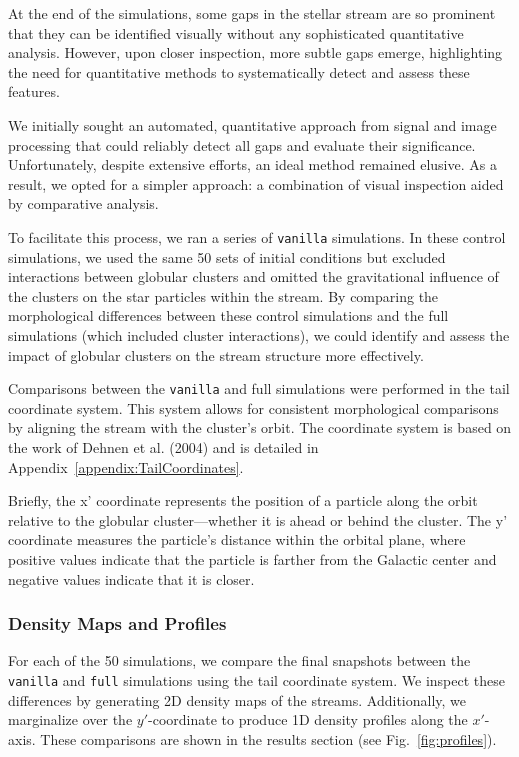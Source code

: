\documentclass[draft]{aa}
\begin{document}
    At the end of the simulations, some gaps in the stellar stream are so prominent that they can be identified visually without any sophisticated quantitative analysis. However, upon closer inspection, more subtle gaps emerge, highlighting the need for quantitative methods to systematically detect and assess these features.

    We initially sought an automated, quantitative approach from signal and image processing that could reliably detect all gaps and evaluate their significance. Unfortunately, despite extensive efforts, an ideal method remained elusive. As a result, we opted for a simpler approach: a combination of visual inspection aided by comparative analysis.

    To facilitate this process, we ran a series of \texttt{vanilla} simulations. In these control simulations, we used the same 50 sets of initial conditions but excluded interactions between globular clusters and omitted the gravitational influence of the clusters on the star particles within the stream. By comparing the morphological differences between these control simulations and the full simulations (which included cluster interactions), we could identify and assess the impact of globular clusters on the stream structure more effectively.


    Comparisons between the \texttt{vanilla} and full simulations were performed in the tail coordinate system. This system allows for consistent morphological comparisons by aligning the stream with the cluster's orbit. The coordinate system is based on the work of Dehnen et al. (2004) and is detailed in Appendix~\ref{appendix:TailCoordinates}.

    Briefly, the x' coordinate represents the position of a particle along the orbit relative to the globular cluster—whether it is ahead or behind the cluster. The y' coordinate measures the particle's distance within the orbital plane, where positive values indicate that the particle is farther from the Galactic center and negative values indicate that it is closer.

    \subsubsection*{Density Maps and Profiles}
      For each of the 50 simulations, we compare the final snapshots between the \texttt{vanilla} and \texttt{full} simulations using the tail coordinate system. We inspect these differences by generating 2D density maps of the streams. Additionally, we marginalize over the $y'$-coordinate to produce 1D density profiles along the $x'$-axis. These comparisons are shown in the results section (see Fig.~\ref{fig:profiles}).
\end{document}
